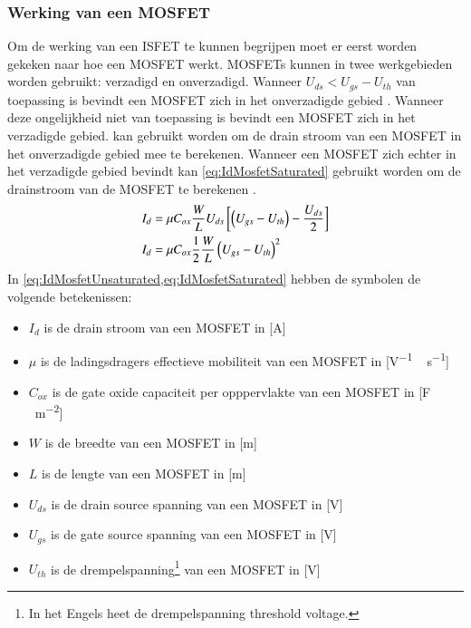 \subsubsection{Werking van een MOSFET}
Om de werking van een ISFET te kunnen begrijpen moet er eerst worden gekeken naar hoe een MOSFET werkt.
MOSFETs kunnen in twee werkgebieden worden gebruikt: verzadigd en onverzadigd. Wanneer $U_{ds}<U_{gs}-U_{th}$ van toepassing is bevindt een MOSFET zich in het onverzadigde gebied \cite{bergveld1985impactOfMosfetBasedSensors,inleidingInDeElektronicaWissenburgh}. Wanneer deze ongelijkheid niet van toepassing is bevindt een MOSFET zich in het verzadigde gebied.  kan gebruikt worden om de drain stroom van een MOSFET in het onverzadigde gebied mee te berekenen. Wanneer een MOSFET zich echter in het verzadigde gebied bevindt kan \cref{eq:IdMosfetSaturated} gebruikt worden om de drainstroom van de MOSFET te berekenen \cite{elbasfun,inleidingInDeElektronicaWissenburgh,bergveld1985impactOfMosfetBasedSensors,isfetAsAnElectronicDevice,DonaldNeamenSemiconductorPhysicsAndDevicesBasicPrinciples}. %
\begin{align}
    I_d{}&={}\mu C_{ox}\frac{W}{L}U_{ds}\left[\left(U_{gs}-U_{th}\right)-\frac{U_{ds}}{2}\right]
    \tagaddtext{[\si{\ampere}]} \label{eq:IdMosfetUnsaturated}\\
    I_d{}&={}\mu C_{ox}\frac{1}{2}\frac{W}{L}\left(U_{gs}-U_{th}\right)^2
    \tagaddtext{[\si{\ampere}]} \label{eq:IdMosfetSaturated}
\end{align}
In \cref{eq:IdMosfetUnsaturated,eq:IdMosfetSaturated} hebben de symbolen de volgende betekenissen:
\begin{itemize}
    \item $I_d$ is de drain stroom van een MOSFET in [\si{\ampere}]
    \item $\mu$ is de ladingsdragers effectieve mobiliteit van een MOSFET in [\si{\volt^{-1}\,\second^{-1}}]
    \item $C_{ox}$ is de gate oxide capaciteit per opppervlakte van een MOSFET in [\si{\farad\,\meter^{-2}}]
    \item $W$ is de breedte van een MOSFET in [\si{\meter}]
    \item $L$ is de lengte van een MOSFET in [\si{\meter}]
    \item $U_{ds}$ is de drain source spanning van een MOSFET in [\si{\volt}]
    \item $U_{gs}$ is de gate source spanning van een MOSFET in [\si{\volt}]
    \item $U_{th}$ is de drempelspanning\footnote{In het Engels heet de drempelspanning threshold voltage.} van een MOSFET in [\si{\volt}]
\end{itemize}

